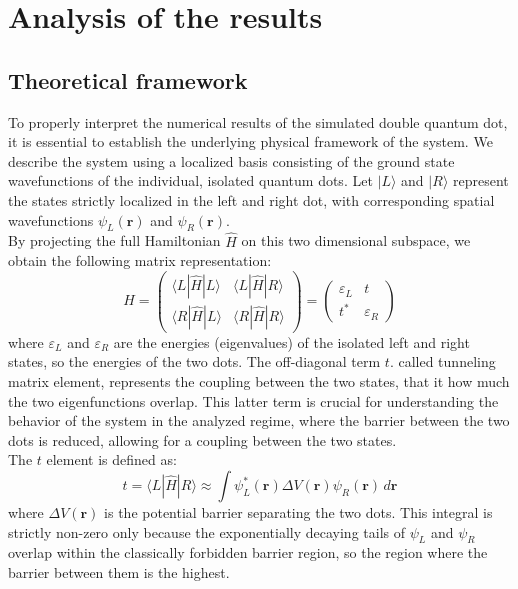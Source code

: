 \chapter{Analysis of the results}
\section{Theoretical framework}
To properly interpret the numerical results of the simulated double quantum dot, it is essential to establish the underlying physical framework of the system.
We describe the system using a localized basis consisting of the ground state wavefunctions of the individual, isolated quantum dots. Let $|L\rangle$ and $|R\rangle$ represent the states strictly localized in the left and right dot, with corresponding spatial wavefunctions $\psi_L(\mathbf{r})$ and $\psi_R(\mathbf{r})$.\\
By projecting the full Hamiltonian $\hat{H}$ on this two dimensional subspace, we obtain the following matrix representation:
\begin{equation}
    H = \begin{pmatrix} 
    \langle L | \hat{H} | L \rangle & \langle L | \hat{H} | R \rangle \\ 
    \langle R | \hat{H} | L \rangle & \langle R | \hat{H} | R \rangle 
    \end{pmatrix} 
    = \begin{pmatrix} 
    \varepsilon_L & t \\ 
    t^* & \varepsilon_R 
    \end{pmatrix}
\end{equation}
where $\varepsilon_L$ and $\varepsilon_R$ are the energies (eigenvalues) of the isolated left and right states, so the energies of the two dots. The off-diagonal term $t$. called tunneling matrix element, represents the coupling between the two states, that it how much the two eigenfunctions overlap. This latter term is crucial for understanding the behavior of the system in the analyzed regime, where the barrier between the two dots is reduced, allowing for a coupling between the two states.\\

The $t$ element is defined as:
\begin{equation}
    t = \langle L | \hat{H} | R \rangle \approx \int \psi_L^*(\mathbf{r}) \Delta V(\mathbf{r}) \psi_R(\mathbf{r}) \, d\mathbf{r}
\end{equation}
where $\Delta V(\mathbf{r})$ is the potential barrier separating the two dots. This integral is strictly non-zero only because the exponentially decaying tails of $\psi_L$ and $\psi_R$ overlap within the classically forbidden barrier region, so the region where the barrier between them is the highest.

